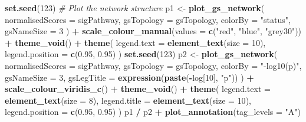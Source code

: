\documentclass[9pt,a4paper,]{extarticle}
\newenvironment{Shaded}{\begin{snugshade}}{\end{snugshade}}
\newcommand{\AttributeTok}[1]{\textcolor[rgb]{0.13,0.29,0.53}{#1}}
\newcommand{\CommentTok}[1]{\textcolor[rgb]{0.56,0.35,0.01}{\textit{#1}}}
\newcommand{\DecValTok}[1]{\textcolor[rgb]{0.00,0.00,0.81}{#1}}
\newcommand{\FloatTok}[1]{\textcolor[rgb]{0.00,0.00,0.81}{#1}}
\newcommand{\FunctionTok}[1]{\textcolor[rgb]{0.13,0.29,0.53}{\textbf{#1}}}
\newcommand{\NormalTok}[1]{#1}
\newcommand{\OtherTok}[1]{\textcolor[rgb]{0.56,0.35,0.01}{#1}}
\newcommand{\SpecialCharTok}[1]{\textcolor[rgb]{0.81,0.36,0.00}{\textbf{#1}}}
\newcommand{\StringTok}[1]{\textcolor[rgb]{0.31,0.60,0.02}{#1}}
\begin{document}
\begin{Shaded}
\begin{Highlighting}[]
\FunctionTok{set.seed}\NormalTok{(}\DecValTok{123}\NormalTok{)}
\CommentTok{\# Plot the network structure}
\NormalTok{p1 }\OtherTok{\textless{}{-}} \FunctionTok{plot\_gs\_network}\NormalTok{(}
  \AttributeTok{normalisedScores =}\NormalTok{ sigPathway, }\AttributeTok{gsTopology =}\NormalTok{ gsTopology, }\AttributeTok{colorBy =} \StringTok{"status"}\NormalTok{,}
  \AttributeTok{gsNameSize =} \DecValTok{3}
\NormalTok{) }\SpecialCharTok{+}
  \FunctionTok{scale\_colour\_manual}\NormalTok{(}\AttributeTok{values =} \FunctionTok{c}\NormalTok{(}\StringTok{"red"}\NormalTok{, }\StringTok{"blue"}\NormalTok{, }\StringTok{"grey30"}\NormalTok{)) }\SpecialCharTok{+}
  \FunctionTok{theme\_void}\NormalTok{() }\SpecialCharTok{+}
  \FunctionTok{theme}\NormalTok{(}
    \AttributeTok{legend.text =} \FunctionTok{element\_text}\NormalTok{(}\AttributeTok{size =} \DecValTok{10}\NormalTok{),}
    \AttributeTok{legend.position =} \FunctionTok{c}\NormalTok{(}\FloatTok{0.95}\NormalTok{, }\FloatTok{0.95}\NormalTok{)}
\NormalTok{  ) }
\FunctionTok{set.seed}\NormalTok{(}\DecValTok{123}\NormalTok{)}
\NormalTok{p2 }\OtherTok{\textless{}{-}} \FunctionTok{plot\_gs\_network}\NormalTok{(}
  \AttributeTok{normalisedScores =}\NormalTok{ sigPathway,}
  \AttributeTok{gsTopology =}\NormalTok{ gsTopology, }
  \AttributeTok{colorBy  =} \StringTok{"{-}log10(p)"}\NormalTok{, }
  \AttributeTok{gsNameSize =} \DecValTok{3}\NormalTok{,}
  \AttributeTok{gsLegTitle =} \FunctionTok{expression}\NormalTok{(}\FunctionTok{paste}\NormalTok{(}\SpecialCharTok{{-}}\NormalTok{log[}\DecValTok{10}\NormalTok{], }\StringTok{"p"}\NormalTok{))}
\NormalTok{) }\SpecialCharTok{+}
  \FunctionTok{scale\_colour\_viridis\_c}\NormalTok{() }\SpecialCharTok{+}
  \FunctionTok{theme\_void}\NormalTok{() }\SpecialCharTok{+}
  \FunctionTok{theme}\NormalTok{(}
    \AttributeTok{legend.text =} \FunctionTok{element\_text}\NormalTok{(}\AttributeTok{size =} \DecValTok{8}\NormalTok{),}
    \AttributeTok{legend.title =} \FunctionTok{element\_text}\NormalTok{(}\AttributeTok{size =} \DecValTok{10}\NormalTok{),}
    \AttributeTok{legend.position =} \FunctionTok{c}\NormalTok{(}\FloatTok{0.95}\NormalTok{, }\FloatTok{0.95}\NormalTok{)}
\NormalTok{  ) }
\NormalTok{p1 }\SpecialCharTok{/}\NormalTok{ p2 }\SpecialCharTok{+} \FunctionTok{plot\_annotation}\NormalTok{(}\AttributeTok{tag\_levels =} \StringTok{"A"}\NormalTok{) }
\end{Highlighting}
\end{Shaded}
\end{document}

